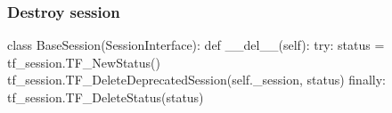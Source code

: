 \begin{content}
\subsubsection{Destroy session}

\begin{leftbar}
\begin{python}
class BaseSession(SessionInterface):
  def __del__(self):
    try:
      status = tf_session.TF_NewStatus()
      tf_session.TF_DeleteDeprecatedSession(self._session, status)
    finally:
      tf_session.TF_DeleteStatus(status)
\end{python}
\end{leftbar}

\end{content}

